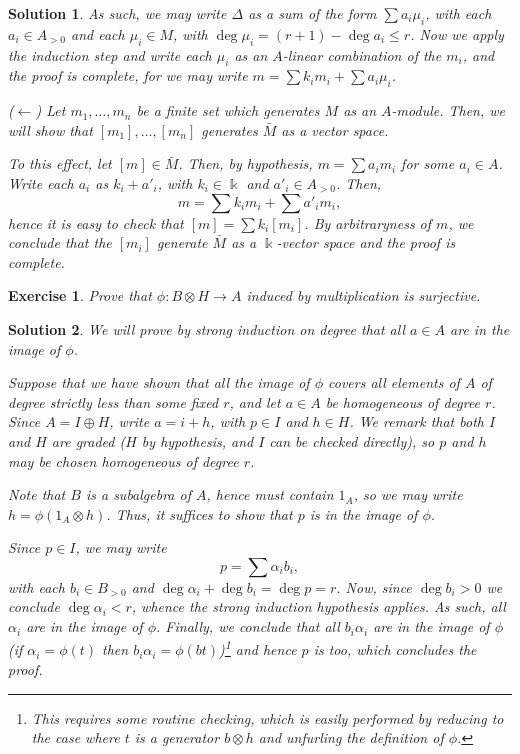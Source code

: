 \documentclass{article}
\newtheorem{ex}{Exercise}
\theoremstyle{nonumberplain}
\newtheorem{sol}{Solution}
\newcommand{\kk}{\Bbbk}
\begin{document}
\begin{sol}
As such, we may write $\Delta$ as a sum of the form $\sum a_i \mu_i$, with each $a_i \in A_{>0}$ and each $\mu_i \in M$, with $\deg \mu_i = (r+1) - \deg a_i \leq r$. Now we apply the induction step and write each $\mu_i$ as an $A$-linear combination of the $m_i$, and the proof is complete, for we may write $m = \sum k_i m_i + \sum a_i \mu_i$.

($\leftarrow$) Let $m_1, \dots, m_n$ be a finite set which generates $M$ as an $A$-module. Then, we will show that $[m_1], \dots, [m_n]$ generates $\bar M$ as a vector space.

To this effect, let $[m] \in \bar M$. Then, by hypothesis, $m = \sum a_i m_i$ for some $a_i \in A$. Write each $a_i$ as $k_i + a'_i$, with $k_i \in \kk$ and $a'_i \in A_{>0}$. Then,
\begin{equation}
m = \sum k_i m_i + \sum a'_i m_i,
\end{equation}
hence it is easy to check that $[m] = \sum k_i [m_i]$. By arbitraryness of $m$, we conclude that the $[m_i]$ generate $\bar M$ as a $\kk$-vector space and the proof is complete.
\end{sol}

\begin{ex}
Prove that $\phi \colon B \otimes H \to A$ induced by multiplication is surjective.
\end{ex}

\begin{sol}
We will prove by strong induction on degree that all $a \in A$ are in the image of $\phi$.

Suppose that we have shown that all the image of $\phi$ covers all elements of $A$ of degree strictly less than some fixed $r$, and let $a \in A$ be homogeneous of degree $r$. Since $A = I \oplus H$, write $a = i + h$, with $p \in I$ and $h \in H$. We remark that both $I$ and $H$ are graded ($H$ by hypothesis, and $I$ can be checked directly), so $p$ and $h$ may be chosen homogeneous of degree $r$.

Note that $B$ is a subalgebra of $A$, hence must contain $1_A$, so we may write $h = \phi(1_A \otimes h)$. Thus, it suffices to show that $p$ is in the image of $\phi$.

Since $p \in I$, we may write
\begin{equation}
p = \sum \alpha_i b_i,
\end{equation}
with each $b_i \in B_{>0}$ and $\deg \alpha_i + \deg b_i = \deg p = r$. Now, since $\deg b_i > 0$ we conclude $\deg \alpha_i < r$, whence the strong induction hypothesis applies. As such, all $\alpha_i$ are in the image of $\phi$. Finally, we conclude that all $b_i \alpha_i$ are in the image of $\phi$ (if $\alpha_i = \phi(t)$ then $b_i \alpha_i = \phi(bt)$)\footnote{This requires some routine checking, which is easily performed by reducing to the case where $t$ is a generator $b \otimes h$ and unfurling the definition of $\phi$.} and hence $p$ is too, which concludes the proof.
\end{sol}
\end{document}
